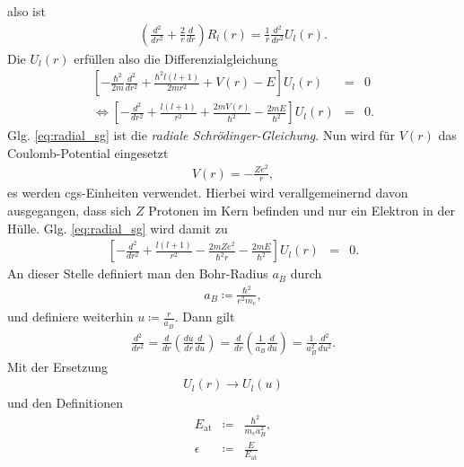 \documentclass{book}
\begin{document}
%
also ist
%
\begin{eqnarray}
\left(\frac{d^2}{dr^2} + \frac{2}{r}\frac{d}{dr}\right)R_l\left(r\right) = \frac{1}{r}\frac{d^2}{dr^2}U_l\left(r\right).
\end{eqnarray}
%
Die $U_l\left(r\right)$ erfüllen also die Differenzialgleichung
%
\begin{eqnarray}
\left[-\frac{\hbar^2}{2m}\frac{d^2}{dr^2} + \frac{\hbar^2l\left(l + 1\right)}{2mr^2} + V\left(r\right) - E\right]U_l\left(r\right) & = & 0\nonumber\\
\Leftrightarrow \left[-\frac{d^2}{dr^2} + \frac{l\left(l + 1\right)}{r^2} + \frac{2mV\left(r\right)}{\hbar^2} - \frac{2mE}{\hbar^2}\right]U_l\left(r\right) & = & 0.\label{eq:radial_sg}
\end{eqnarray}
%
Glg. \eqref{eq:radial_sg} ist die \textit{radiale Schrödinger-Gleichung}. Nun wird für $V\left(r\right)$ das Coulomb-Potential eingesetzt
%
\begin{eqnarray}
V\left(r\right) = -\frac{Ze^2}{r}, 
\end{eqnarray}
%
es werden cgs-Einheiten verwendet. Hierbei wird verallgemeinernd davon ausgegangen, dass sich $Z$ Protonen im Kern befinden und nur ein Elektron in der Hülle. Glg. \eqref{eq:radial_sg} wird damit zu
%
\begin{eqnarray}
\left[-\frac{d^2}{dr^2} + \frac{l\left(l + 1\right)}{r^2} - \frac{2mZe^2}{\hbar^2r} - \frac{2mE}{\hbar^2}\right]U_l\left(r\right) & = & 0.\label{eq:radial_sgh}
\end{eqnarray}
%
An dieser Stelle definiert man den Bohr-Radius $a_B$ durch
%
\begin{eqnarray}
a_B \coloneqq \frac{\hbar^2}{e^2m_e}, \label{eq:def_bohr}
\end{eqnarray}
%
und definiere weiterhin $u \coloneqq \frac{r}{a_B}$. Dann gilt
%
\begin{eqnarray}
\frac{d^2}{dr^2} = \frac{d}{dr}\left(\frac{du}{dr}\frac{d}{du}\right) = \frac{d}{dr}\left(\frac{1}{a_B}\frac{d}{du}\right) = \frac{1}{a_B^2}\frac{d^2}{du^2}.
\end{eqnarray}
%
Mit der Ersetzung
%
\begin{eqnarray}
U_l\left(r\right)\to U_l\left(u\right)
\end{eqnarray}
%
und den Definitionen
%
\begin{eqnarray}
E_{\text{at}}& \coloneqq &\frac{\hbar^2}{m_ea_B^2},\\
\epsilon& \coloneqq &\frac{E}{E_{\text{at}}}
\end{eqnarray}
\end{document}
